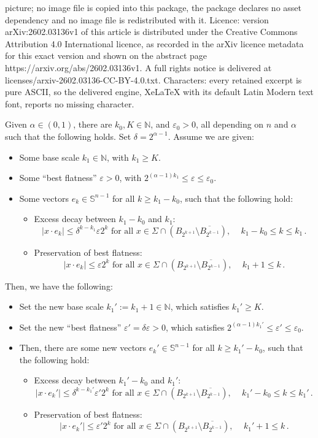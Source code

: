\documentclass[10pt,a4paper]{amsart}
\newcommand{\N}{\mathbb{N}}
\newcommand{\Sp}{\mathbb{S}}
\newcommand{\ep}{\varepsilon}
\begin{document}
picture; no image file is copied into this package, the package declares no asset dependency and no image file is redistributed with it. Licence: version arXiv:2602.03136v1 of this article is distributed under the Creative Commons Attribution 4.0 International licence, as recorded in the arXiv licence metadata for this exact version and shown on the abstract page https://arxiv.org/abs/2602.03136v1. A full rights notice is delivered at licenses/arxiv-2602.03136-CC-BY-4.0.txt. Characters: every retained excerpt is pure ASCII, so the delivered engine, XeLaTeX with its default Latin Modern text font, reports no missing character.
\begin{proposition}\label{prop:mainiteration}
    Given $\alpha\in(0,1)$, there are $k_0,K\in\N$, and $\ep_0>0$, all depending on $n$ and $\alpha$ such that the following holds. Set $\delta=2^{\alpha-1}$. Assume we are given:
    \begin{itemize}
        \item Some base scale $k_1\in\N$, with $k_1\geq K$.
        \item Some ``best flatness'' $\ep>0$, with $2^{(\alpha-1) k_1}\leq \ep\leq \ep_0$.
        \item Some vectors $e_k\in \Sp^{n-1}$ for all $k\geq k_1-k_0$, such that the following hold:
\begin{itemize}
    \item Excess decay between $k_1-k_0$ and $k_1$:
    $$|x\cdot e_{k}|\leq \delta^{k-k_1}\ep 2^{k} \mbox{ for all } x\in\Sigma\cap(B_{2^{k+1}}\setminus \overline{B_{2^{k-1}}}),\,\quad k_1-k_0\leq k \leq k_1\,.$$
    \item Preservation of best flatness: $$|x\cdot e_{k}|\leq \ep 2^{k} \mbox{ for all } x\in\Sigma\cap(B_{2^{k+1}}\setminus \overline{B_{2^{k-1}}}),\,\quad k_1+1\leq k \,.$$
\end{itemize}
    \end{itemize}
Then, we have the following:
    \begin{itemize}
        \item Set the new base scale $k_1':=k_1+1\in\N$, which satisfies $k_1'\geq K$.
        \item Set the new ``best flatness'' $\ep'=\delta\ep>0$, which satisfies $2^{(\alpha-1) k_1'}\leq \ep'\leq \ep_0$.
        \item Then, there are some new vectors $e_k'\in \Sp^{n-1}$ for all $k\geq k_1'-k_0$, such that the following hold:
\begin{itemize}
    \item Excess decay between $k_1'-k_0$ and $k_1'$:
    $$|x\cdot e_{k}'|\leq \delta^{k-k_1'}\ep' 2^{k} \mbox{ for all } x\in\Sigma\cap(B_{2^{k+1}}\setminus \overline{B_{2^{k-1}}}),\,\quad k_1'-k_0\leq k \leq k_1'\,.$$
    \item Preservation of best flatness: $$|x\cdot e_{k}'|\leq \ep' 2^{k} \mbox{ for all } x\in\Sigma\cap(B_{2^{k+1}}\setminus \overline{B_{2^{k-1}}}),\,\quad k_1'+1\leq k \,.$$
\end{itemize}
    \end{itemize}
\end{proposition}
\end{document}
